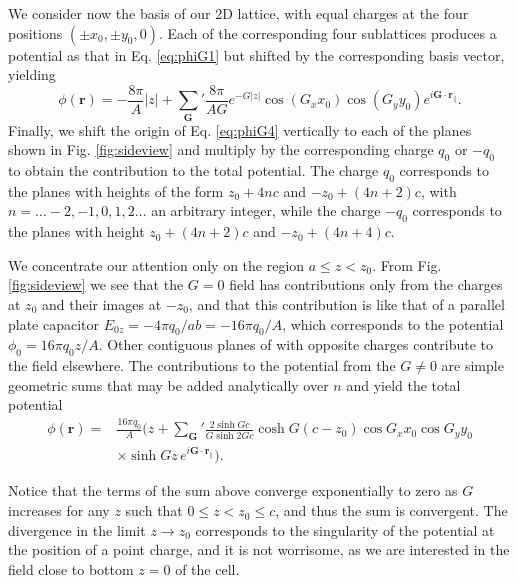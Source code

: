 \documentclass{article}
\newcommand{\abs}[1]{\lvert#1\rvert}
\begin{document}
We consider now the basis of our 2D lattice, with equal charges at the
four positions $(\pm x_0, \pm y_0,0)$. Each of the corresponding four
sublattices produces a potential as that in Eq. \eqref{eq:phiG1} but
shifted by the corresponding basis vector, yielding
\begin{equation}
  \label{eq:phiG4}
  \phi(\bm r) = -\frac{8\pi}{A} \abs{z}
    +{\sum_{\bm G}}' \frac{8\pi}{AG} e^{- G \abs{z}}\cos(G_x x_0)
    \cos(G_y y_0) e^{i \bm G\cdot\bm r_\|}.
\end{equation}
Finally, we shift the origin of Eq. \eqref{eq:phiG4} vertically to each of the planes shown in
Fig. \ref{fig:sideview} and multiply by the corresponding charge $q_0$
or $-q_0$ to obtain the contribution to the total potential. The charge $q_0$ corresponds to
the planes with heights of the form $z_0+4nc$ and $-z_0+(4n+2)c$, with
$n=\ldots-2,-1,0,1,2\ldots$ an arbitrary integer, while the charge
$-q_0$ corresponds to the planes with height $z_0+(4n+2)c$ and
$-z_0+(4n+4)c$.

We concentrate our attention only on the region $a\le z<z_0$. From
Fig. \ref{fig:sideview} we see that the $G=0$
field has contributions only from the charges at $z_0$ and their
images at $-z_0$, and that this contribution is like that of a parallel plate
capacitor $E_{0z}=-4\pi q_0/ab=-16\pi q_0/A$, which corresponds to the
potential $\phi_0=16\pi q_0 z/A$. Other contiguous planes of with opposite charges
contribute to the field elsewhere. The contributions to the potential
from the $G\ne0$ are simple geometric sums that may be added
analytically over $n$ and yield the total potential
\begin{equation}
  \label{eq:phitot}
  \begin{split}
    \phi(\bm r)=&\frac{16\pi q_0}{A}\biggl(z+{\sum_{\bm G}}'\frac{2\sinh
      Gc}{G \sinh 2Gc}\cosh G(c-z_0)\cos G_x x_0 \cos G_y y_0\\
    &\times \sinh Gz\, e^{i\bm G\cdot\bm r_\|}\biggr).
  \end{split}
\end{equation}

Notice that the terms of the sum above converge exponentially to zero
as $G$ increases for any $z$ such that $0\le z <z_0 \le c$, and thus
the sum is convergent. The divergence in the limit $ z
\longrightarrow z_0 $ corresponds to the singularity of the potential
at the position of a point charge, and it is not worrisome, as we are
interested in the field close to bottom $z=0$ of the cell.
\end{document}
